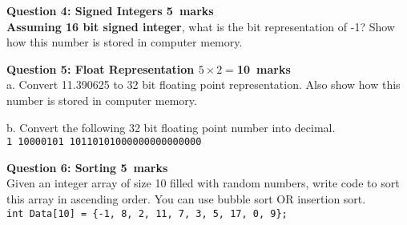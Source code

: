\documentclass[12pt,a4paper]{article}
\def\Qfour{5}
\def\Qfive{10}
\def\Qsix{5}
\begin{document}
\noindent\textbf{Question 4: Signed Integers \hfill \Qfour~marks}\\
\textbf{Assuming 16 bit signed integer}, what is the bit representation of -1? Show how this number is stored in computer memory.
\begin{figure}[H]
\end{figure}

\noindent\textbf{Question 5: Float Representation \hfill $5\times 2=$\Qfive~marks}\\
a. Convert 11.390625 to 32 bit floating point representation. Also show how this number is stored in computer memory.
\begin{figure}[H]
\end{figure}
\noindent b. Convert the following 32 bit floating point number into decimal.\\
\verb|1 10000101 10110101000000000000000|
\begin{figure}[H]
\end{figure}

\noindent\textbf{Question 6: Sorting \hfill \Qsix~marks}\\
Given an integer array of size 10 filled with random numbers, write code to sort this array in ascending order. You can use bubble sort OR insertion sort.\\
\verb|int Data[10] = {-1, 8, 2, 11, 7, 3, 5, 17, 0, 9};|
\begin{figure}[H]
\end{figure}
\end{document}
